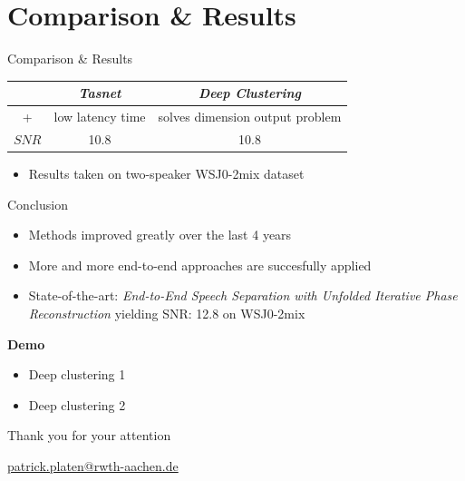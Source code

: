 \documentclass[xcolor=table,mathserif,9pt]{beamer}    %
\begin{document}
\section{Comparison \& Results}%
\label{sec:results}
\begin{frame}{Comparison \& Results}

\begin{table}
\centering
\begin{tabular}{|c|c|c|}
	\hline
	 & \emph{Tasnet} & \emph{Deep Clustering}  \\
	\hline
	 +      & low latency time & solves dimension output problem \\
	 $SNR$   & 10.8   & 10.8  \\
	\hline
\end{tabular}
\end{table}

\vspace{10mm}
\begin{itemize}
	\item Results taken on two-speaker WSJ0-2mix dataset \cite{TasNet2017}
\end{itemize}
\end{frame}

\begin{frame}{Conclusion}

\begin{itemize}
	\item Methods improved greatly over the last 4 years
	\item More and more end-to-end approaches are succesfully applied 
	\item State-of-the-art: \emph{End-to-End Speech Separation with Unfolded Iterative Phase Reconstruction} yielding SNR: 12.8 on WSJ0-2mix \cite{2018arXiv180410204W}
\end{itemize}

\vspace{10mm}
\textbf{Demo} \cite{Demo}
\begin{itemize}
	\item Deep clustering 1 
	\item Deep clustering 2
\end{itemize}

\end{frame}


\begin{frame}[label=finalSlide]
  \label{LastPage}%
  \begin{center}
    \vfill
    {\Large
    \textcolor{i6bluedark}{Thank you for your attention}
    }
    \vfill
    {\insertauthor}

    \vspace{10mm}
    \url{patrick.platen@rwth-aachen.de}
  \end{center}
\end{frame}
\end{document}
